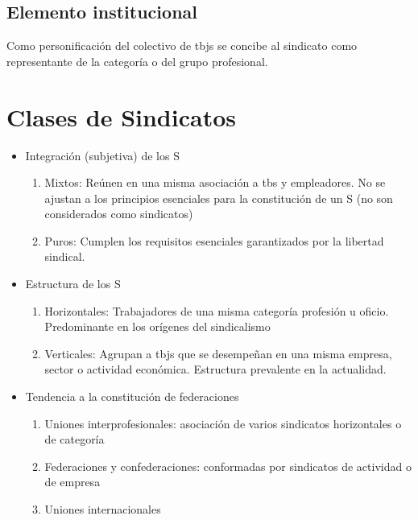 \documentclass[spanish,12pt,a4paper,titlepage]{report}
\begin{document}
\subsection{Elemento institucional}

Como personificación del colectivo de tbjs se concibe al sindicato como representante de la categoría o del grupo profesional. 


\section{Clases de Sindicatos}

\begin{itemize}
\item Integración (subjetiva) de los S
	\begin{enumerate}
	\item Mixtos: Reúnen en una misma asociación a tbs y empleadores. No se ajustan a los principios esenciales para la constitución de un S (no son considerados como sindicatos)
	\item Puros: Cumplen los requisitos esenciales garantizados por la libertad sindical.
	\end{enumerate}
\item Estructura de los S
	\begin{enumerate}
	\item Horizontales: Trabajadores de una misma categoría profesión u oficio. Predominante en los orígenes del sindicalismo
	\item Verticales: Agrupan a tbjs que se desempeñan en una misma empresa, sector o actividad económica. Estructura prevalente en la actualidad.
	\end{enumerate}
\item Tendencia a la constitución de federaciones
	\begin{enumerate}
	\item Uniones interprofesionales: asociación de varios sindicatos horizontales o de categoría
	\item Federaciones y confederaciones: conformadas por sindicatos de actividad o de empresa
	\item Uniones internacionales
	\end{enumerate}
	

\end{itemize}
\end{document}
